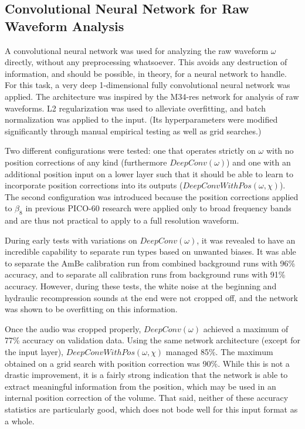 \documentclass[10pt]{article}
\begin{document}
\subsection{Convolutional Neural Network for Raw Waveform Analysis}

A convolutional neural network was used for analyzing the raw waveform $\omega$ directly, without any preprocessing whatsoever. This avoids any destruction of information, and should be possible, in theory, for a neural network to handle. For this task, a very deep 1-dimensional fully convolutional neural network was applied. The architecture was inspired by the M34-res network \cite{verydeepconvnets} for analysis of raw waveforms. L2 regularization was used to alleviate overfitting, and batch normalization was applied to the input. (Its hyperparameters were modified significantly through manual empirical testing as well as grid searches.)

Two different configurations were tested: one that operates strictly on $\omega$ with no position corrections of any kind (furthermore $DeepConv(\omega)$) and one with an additional position input on a lower layer such that it should be able to learn to incorporate position corrections into its outputs ($DeepConvWithPos(\omega, \chi)$). The second configuration was introduced because the position corrections applied to $\beta_{8}$ in previous PICO-60 research were applied only to broad frequency bands and are thus not practical to apply to a full resolution waveform.

During early tests with variations on $DeepConv(\omega)$, it was revealed to have an incredible capability to separate run types based on unwanted biases. It was able to separate the AmBe calibration run from combined background runs with 96\% accuracy, and to separate all calibration runs from background runs with 91\% accuracy. However, during these tests, the white noise at the beginning and hydraulic recompression sounds at the end were not cropped off, and the network was shown to be overfitting on this information.

Once the audio was cropped properly, $DeepConv(\omega)$ achieved a maximum of 77\% accuracy on validation data. Using the same network architecture (except for the input layer), $DeepConvWithPos(\omega, \chi)$ managed 85\%. The maximum obtained on a grid search with position correction was 90\%. While this is not a drastic improvement, it is a fairly strong indication that the network is able to extract meaningful information from the position, which may be used in an internal position correction of the volume. That said, neither of these accuracy statistics are particularly good, which does not bode well for this input format as a whole.
\end{document}
